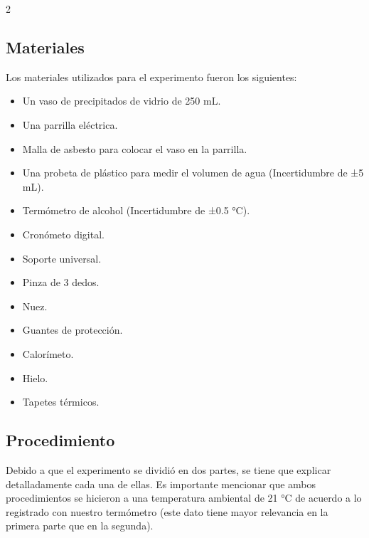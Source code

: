 \documentclass[11pt,letterpaper]{article}
\begin{document}
\begin{multicols}{2}
\subsection{Materiales}
Los materiales utilizados para el experimento fueron los siguientes:
\begin{itemize}
    \item Un vaso de precipitados de vidrio de 250 mL.
    \item Una parrilla eléctrica.
    \item Malla de asbesto para colocar el vaso en la parrilla.
    \item Una probeta de plástico para medir el volumen de agua (Incertidumbre de ±5 mL).
    \item Termómetro de alcohol (Incertidumbre de ±0.5 °C).
    \item Cronómeto digital.
    \item Soporte universal.
    \item Pinza de 3 dedos.
    \item Nuez.
    \item Guantes de protección.
    \item Calorímeto.
    \item Hielo.
    \item Tapetes térmicos.
\end{itemize}


\subsection{Procedimiento}
Debido a que el experimento se dividió en dos partes, se tiene que explicar detalladamente cada una de ellas. Es importante mencionar que ambos procedimientos se hicieron a una temperatura ambiental de 21 °C de acuerdo a lo registrado con nuestro termómetro (este dato tiene mayor relevancia en la primera parte que en la segunda).



\end{multicols}
\end{document}
